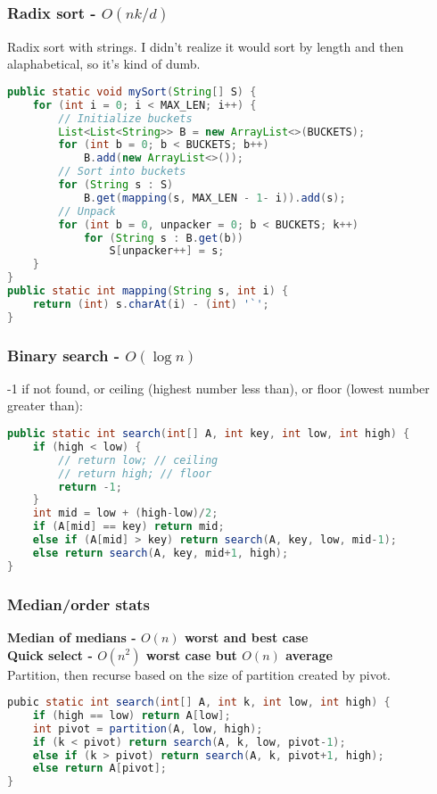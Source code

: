 \documentclass[10pt]{article}
\begin{document}
\subsubsection{Radix sort - $O(nk/d)$}
Radix sort with strings. I didn't realize it would sort by length and then alaphabetical, so it's kind of dumb.
\begin{lstlisting}[language=java]
public static void mySort(String[] S) {                                  
    for (int i = 0; i < MAX_LEN; i++) {                                    
        // Initialize buckets                                                
        List<List<String>> B = new ArrayList<>(BUCKETS);                  
        for (int b = 0; b < BUCKETS; b++)
            B.add(new ArrayList<>());                                       
        // Sort into buckets                                       
        for (String s : S)                                           
            B.get(mapping(s, MAX_LEN - 1- i)).add(s);
        // Unpack
        for (int b = 0, unpacker = 0; b < BUCKETS; k++)                             
            for (String s : B.get(b))
                S[unpacker++] = s;                           
    }
}
public static int mapping(String s, int i) {                             
    return (int) s.charAt(i) - (int) '`';                                  
}
\end{lstlisting}

\subsubsection{Binary search - $O(\log n)$}
-1 if not found, or ceiling (highest number less than), or floor (lowest number greater than):
\begin{lstlisting}[language=java]
public static int search(int[] A, int key, int low, int high) {
    if (high < low) {
        // return low; // ceiling
        // return high; // floor
        return -1;
    }
    int mid = low + (high-low)/2;
    if (A[mid] == key) return mid;
    else if (A[mid] > key) return search(A, key, low, mid-1);
    else return search(A, key, mid+1, high);
}
\end{lstlisting}

\subsubsection{Median/order stats}
\textbf{Median of medians - $O(n)$ worst and best case}\\
\textbf{Quick select - $O(n^2)$ worst case but $O(n)$ average}\\
Partition, then recurse based on the size of partition created by pivot.
\begin{lstlisting}[language=java]
pubic static int search(int[] A, int k, int low, int high) {
    if (high == low) return A[low];
    int pivot = partition(A, low, high);
    if (k < pivot) return search(A, k, low, pivot-1);
    else if (k > pivot) return search(A, k, pivot+1, high);
    else return A[pivot];
}
\end{lstlisting}
\end{document}
